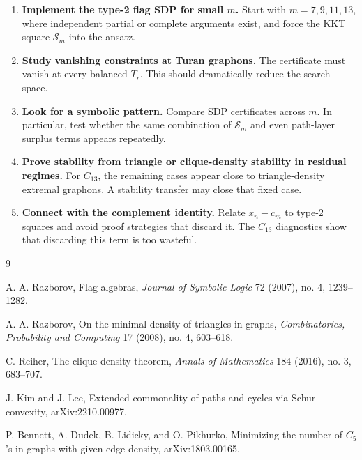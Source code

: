 \documentclass[11pt]{article}
\theoremstyle{definition}
\begin{document}
\begin{enumerate}[leftmargin=2em]
        \item \textbf{Implement the type-2 flag SDP for small $m$.}  Start with $m=7,9,11,13$, where independent partial or complete arguments exist, and force the KKT square $\mathcal S_m$ into the ansatz.

        \item \textbf{Study vanishing constraints at Turan graphons.}  The certificate must vanish at every balanced $T_r$.  This should dramatically reduce the search space.

        \item \textbf{Look for a symbolic pattern.}  Compare SDP certificates across $m$.  In particular, test whether the same combination of $\mathcal S_m$ and even path-layer surplus terms appears repeatedly.

        \item \textbf{Prove stability from triangle or clique-density stability in residual regimes.}  For $C_{13}$, the remaining cases appear close to triangle-density extremal graphons.  A stability transfer may close that fixed case.

        \item \textbf{Connect with the complement identity.}  Relate $x_n-c_m$ to type-2 squares and avoid proof strategies that discard it.  The $C_{13}$ diagnostics show that discarding this term is too wasteful.
\end{enumerate}

\begin{thebibliography}{9}

A. A. Razborov,
\newblock Flag algebras,
\newblock \emph{Journal of Symbolic Logic} 72 (2007), no. 4, 1239--1282.

A. A. Razborov,
\newblock On the minimal density of triangles in graphs,
\newblock \emph{Combinatorics, Probability and Computing} 17 (2008), no. 4, 603--618.

C. Reiher,
\newblock The clique density theorem,
\newblock \emph{Annals of Mathematics} 184 (2016), no. 3, 683--707.

J. Kim and J. Lee,
\newblock Extended commonality of paths and cycles via Schur convexity,
\newblock arXiv:2210.00977.

P. Bennett, A. Dudek, B. Lidicky, and O. Pikhurko,
\newblock Minimizing the number of $C_5$'s in graphs with given edge-density,
\newblock arXiv:1803.00165.

\end{thebibliography}
\end{document}
